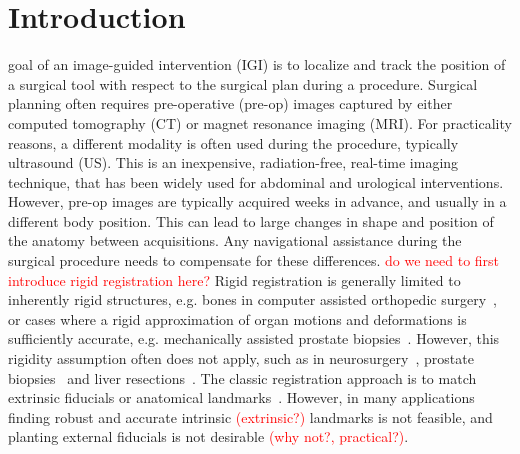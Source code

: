\documentclass[journal]{IEEEtran}
\newcommand{\comment}[1]{\textcolor{red}{#1}}
\begin{document}
\section{Introduction}
 goal of an image-guided intervention (IGI) is to localize and track the position of a surgical tool with respect to the surgical plan during a procedure. Surgical planning often requires pre-operative (pre-op) images captured by either computed tomography (CT) or magnet resonance imaging (MRI). For practicality reasons, a different modality is often used during the procedure, typically ultrasound (US).  This is an inexpensive, radiation-free, real-time imaging technique, that has been widely used for abdominal and urological interventions. However, pre-op images are typically acquired weeks in advance, and usually in a different body position.  This can lead to large changes in shape and position of the anatomy between acquisitions. Any navigational assistance during the surgical procedure needs to compensate for these differences. \comment{do we need to first introduce rigid registration here?} Rigid registration is generally limited to inherently rigid structures, e.g. bones in computer assisted orthopedic surgery~\cite{Brounstein11a,Rasoulian12a}, or cases where a rigid approximation of organ motions and deformations is sufficiently accurate, e.g. mechanically assisted prostate biopsies~\cite{Silva13a}. However, this rigidity assumption often does not apply, such as in neurosurgery~\cite{Ferrant00a}, prostate biopsies~\cite{Baumann12a} and liver resections~\cite{Rucker14a}. The classic registration approach is to match extrinsic fiducials or anatomical landmarks~\cite{Arun87a}. However, in many applications finding robust and accurate intrinsic \comment{(extrinsic?)} landmarks is not feasible, and planting external fiducials is not desirable \comment{(why not?, practical?)}. 
\end{document}
